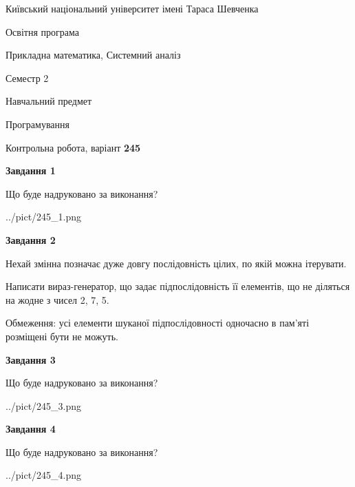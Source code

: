 \documentclass[12pt, ukrainian]{article}
\begin{document}
{{\begin {small}\par
{ \center  Київський національний університет імені Тараса Шевченка \par}
{\parbox {5 cm}{Освітня програма \hfill}{\parbox {8 cm}{Прикладна математика, Системний аналіз \hfill}}\parbox {5 cm}{\hfill Семестр 2}}\par
{\parbox {5 cm} {Навчальний предмет \hfill}\parbox {7 cm}{Програмування \hfill}\parbox {6cm}{\hfill}\par}\vspace{-7pt} \end{small}}{\center Контрольна робота, варіант  \No \textbf
{ 245 }\par}}
{
\begin {large}
{\begin {center}\textbf{Завдання 1}\end {center}}\par
Що буде надруковано за виконання?\par\par
\begin{center}
	{../pict/245_1.png}
\end{center}
\newpage

{\begin {center}\textbf{Завдання 2}\end {center}}\par
Нехай змінна  позначає дуже довгу послідовність цілих, по якій можна ітерувати.

Написати вираз-генератор, що задає підпослідовність її елементів, що не діляться на жодне з чисел 2, 7, 5.

Обмеження: усі елементи шуканої підпослідовності одночасно в пам'яті розміщені бути не можуть.\par
\newpage

{\begin {center}\textbf{Завдання 3}\end {center}}\par
Що буде надруковано за виконання?\par
\begin{center}
	{../pict/245_3.png}
\end{center}
\newpage

{\begin {center}\textbf{Завдання 4}\end {center}}\par
Що буде надруковано за виконання?\par
\begin{center}
	{../pict/245_4.png}
\end{center}
\newpage


\end{large}}
\end{document}
